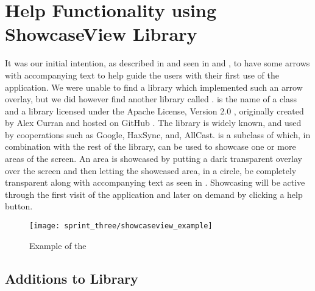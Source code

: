 
\section{Help Functionality using ShowcaseView Library}
\label{sec:help_functionality_using_showcaseview_library}

It was our initial intention, as described in  and seen in  and , to have some arrows with accompanying text to help guide the users with their first use of the application. We were unable to find a library which implemented such an arrow overlay, but we did however find another library called .  is the name of a class and a library licensed under the Apache License, Version 2.0 \parencite{apache2license}, originally created by Alex Curran and hosted on GitHub \parencite{showcaseview_by_alex_curran}. The library is widely known, and used by cooperations such as Google, HaxSync, and, AllCast.  is a subclass of  which, in combination with the rest of the library, can be used to showcase one or more areas of the screen. An area is showcased by putting a dark transparent overlay over the screen and then letting the showcased area, in a circle, be completely transparent along with accompanying text as seen in . Showcasing will be active through the first visit of the application and later on demand by clicking a help button. 

\begin{figure}[!htbp]
    \centering
    \texttt{[image: sprint\_three/showcaseview\_example]}
    \caption{Example of the }
    \label{fig:showcaseview_example}
\end{figure}

\subsection{Additions to Library}

